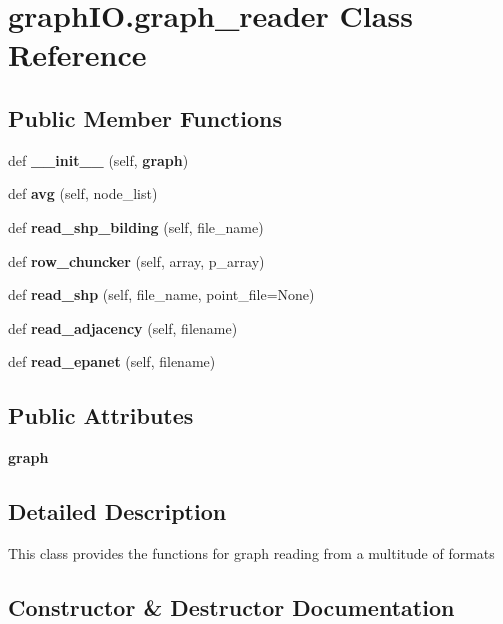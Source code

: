 \section{graph\+I\+O.\+graph\+\_\+reader Class Reference}
\label{classgraph_i_o_1_1graph__reader}
\subsection*{Public Member Functions}
\begin{DoxyCompactItemize}
\item 
def \textbf{ \+\_\+\+\_\+init\+\_\+\+\_\+} (self, \textbf{ graph})
\item 
def \textbf{ avg} (self, node\+\_\+list)
\item 
def \textbf{ read\+\_\+shp\+\_\+bilding} (self, file\+\_\+name)
\item 
def \textbf{ row\+\_\+chuncker} (self, array, p\+\_\+array)
\item 
def \textbf{ read\+\_\+shp} (self, file\+\_\+name, point\+\_\+file=None)
\item 
def \textbf{ read\+\_\+adjacency} (self, filename)
\item 
def \textbf{ read\+\_\+epanet} (self, filename)
\end{DoxyCompactItemize}
\subsection*{Public Attributes}
\begin{DoxyCompactItemize}
\item 
\textbf{ graph}
\end{DoxyCompactItemize}


\subsection{Detailed Description}
\begin{DoxyVerb}This class provides the functions for graph reading from a multitude of formats
\end{DoxyVerb}
 

\subsection{Constructor \& Destructor Documentation}
\mbox{\label{classgraph_i_o_1_1graph__reader_a53537ae6fab9301a9559043ccb80f07e}} 
